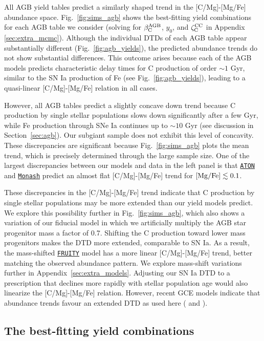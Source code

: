 \documentclass[fleqn,
usenatbib]{mnras}
\newcommand{\fruity}{\texttt{\hyperlink{fruity}{FRUITY}}}
\newcommand{\monash}{\texttt{\hyperlink{monash}{Monash}}}
\newcommand{\aton}{\texttt{\hyperlink{aton}{ATON}}}
\newcommand{\caafe}{[C/Mg]-[Mg/Fe]}
\newcommand{\aagb}{\beta_{\rm C}^{\rm AGB}}
\newcommand{\yo}{y_0}
\newcommand{\zcc}{\zeta_{\rm C}^{\rm CC}}
\begin{document}
All AGB yield tables predict a similarly shaped trend in the \caafe{} abundance space. Fig.~\ref{fig:sims_agb} shows the best-fitting yield combinations for each AGB table we consider (solving for $\aagb$, $\yo$, and $\zcc$ in Appendix \ref{sec:extra_mcmc}). Although the individual DTDs of each AGB table appear substantially different (Fig.~\ref{fig:agb_yields}), the predicted abundance trends do not show substantial differences. 
This outcome arises because each of the AGB models predicts characteristic delay times for C production of order ${\sim}1$ Gyr, similar to the SN Ia production of Fe (see Fig.~\ref{fig:agb_yields}), leading to a quasi-linear [C/Mg]-[Mg/Fe] relation in all cases. 

However, all AGB tables predict a slightly concave down trend because C production by single stellar populations slows down significantly after a few Gyr, while Fe production through SNe Ia continues up to ${\sim}10$ Gyr (see discussion in Section~\ref{sec:agb}). Our subgiant sample does not exhibit this level of concavity. These discrepancies are significant because Fig.~\ref{fig:sims_agb} plots the mean trend, which is precisely determined through the large sample size. One of the largest discrepancies between our models and data in the left panel is that \aton{} and \monash{} predict an almost flat \caafe{} trend for ${\rm [Mg/Fe]} \lesssim 0.1$.

{These discrepancies in the [C/Mg]-[Mg/Fe] trend indicate that C production by single stellar populations may be more extended than our yield models predict.
We explore this possibility further in} Fig.~\ref{fig:sims_agb}, which also shows a variation of our fiducial model in which we artificially multiply the AGB star progenitor mass a factor of 0.7. Shifting the C production toward lower mass progenitors makes the DTD more extended, comparable to SN Ia. As a result, the mass-shifted \fruity{} model has a more linear \caafe{} trend, better matching the observed abundance pattern. We explore mass-shift variations further in Appendix~\ref{sec:extra_models}.
Adjusting our SN Ia DTD to a prescription that declines more rapidly with stellar population age would also linearize the [C/Mg]-[Mg/Fe] relation.
However, recent GCE models indicate that abundance trends favour an extended DTD  as used here (\citealt{palicio+2024} and \citealt{dubay+24}).




\subsection{The best-fitting yield combinations}
\end{document}
